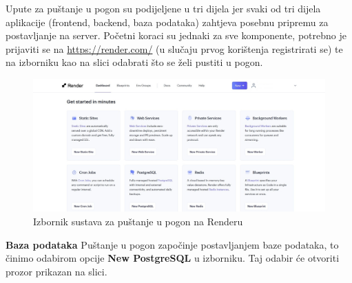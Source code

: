 			Upute za puštanje u pogon su podijeljene u tri dijela jer svaki od tri dijela aplikacije (frontend, backend, baza podataka) zahtjeva posebnu pripremu za postavljanje na server.
			Početni koraci su jednaki za sve komponente, potrebno je prijaviti se na \url{https://render.com/} (u slučaju prvog korištenja registrirati se) te na izborniku kao na slici odabrati što se želi pustiti u pogon.
			\begin{figure}[H]
				\includegraphics[width=\linewidth]{slike/RenderIzbornik.JPG}
				\centering
				\caption{Izbornik sustava za puštanje u pogon na Renderu}
				\label{fig:Izbornik Render}
			\end{figure}
			\textbf{Baza podataka} \newline
			Puštanje u pogon započinje postavljanjem baze podataka, to činimo odabirom opcije \textbf{New PostgreSQL} u izborniku. Taj odabir će otvoriti prozor prikazan na slici.
